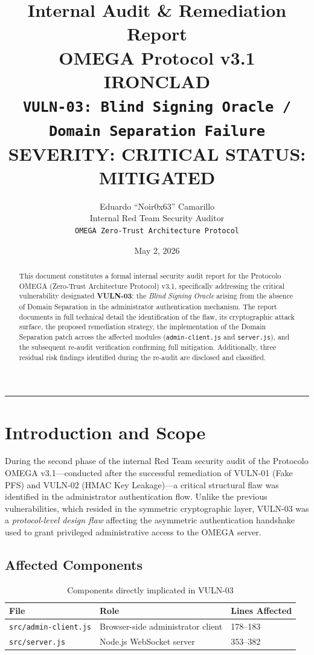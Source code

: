 \documentclass[12pt,a4paper]{article}
\title{
    \textbf{Internal Audit \& Remediation Report}\\[0.5em]
    \Large OMEGA Protocol v3.1 IRONCLAD\\[0.3em]
    \large \texttt{VULN-03: Blind Signing Oracle / Domain Separation Failure}\\[1em]
    \normalsize \textcolor{criticalred}{\textbf{SEVERITY: CRITICAL}} \quad
    \textcolor{safegreen}{\textbf{STATUS: MITIGATED}}
}
\author{
    Eduardo ``Noir0x63'' Camarillo\\
    \small Internal Red Team Security Auditor\\
    \small \texttt{OMEGA Zero-Trust Architecture Protocol}
}
\date{May 2, 2026}
\begin{document}

\maketitle
\hrule
\vspace{1em}

\begin{abstract}
This document constitutes a formal internal security audit report for the Protocolo OMEGA (Zero-Trust Architecture Protocol) v3.1, specifically addressing the critical vulnerability designated \textbf{VULN-03}: the \textit{Blind Signing Oracle} arising from the absence of Domain Separation in the administrator authentication mechanism. The report documents in full technical detail the identification of the flaw, its cryptographic attack surface, the proposed remediation strategy, the implementation of the Domain Separation patch across the affected modules (\texttt{admin-client.js} and \texttt{server.js}), and the subsequent re-audit verification confirming full mitigation. Additionally, three residual risk findings identified during the re-audit are disclosed and classified.
\end{abstract}

\tableofcontents
\newpage

\section{Introduction and Scope}

During the second phase of the internal Red Team security audit of the Protocolo OMEGA v3.1---conducted after the successful remediation of VULN-01 (Fake PFS) and VULN-02 (HMAC Key Leakage)---a critical structural flaw was identified in the administrator authentication flow. Unlike the previous vulnerabilities, which resided in the symmetric cryptographic layer, VULN-03 was a \textit{protocol-level design flaw} affecting the asymmetric authentication handshake used to grant privileged administrative access to the OMEGA server.

\subsection{Affected Components}

\begin{table}[h!]
\centering
\begin{tabularx}{\textwidth}{lXl}
\toprule
\textbf{File} & \textbf{Role} & \textbf{Lines Affected} \\
\midrule
\texttt{src/admin-client.js} & Browser-side administrator client & 178--183 \\
\texttt{src/server.js} & Node.js WebSocket server & 353--382 \\
\bottomrule
\end{tabularx}
\caption{Components directly implicated in VULN-03}
\end{table}
\end{document}
